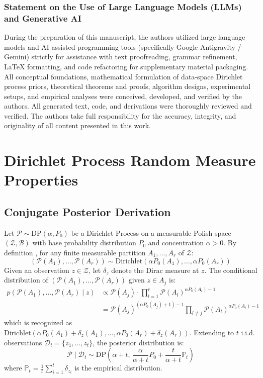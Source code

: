 \documentclass{article}
\begin{document}
\subsubsection*{Statement on the Use of Large Language Models (LLMs) and Generative AI}
During the preparation of this manuscript, the authors utilized large language models and AI-assisted programming tools (specifically Google Antigravity / Gemini) strictly for assistance with text proofreading, grammar refinement, LaTeX formatting, and code refactoring for supplementary material packaging. All conceptual foundations, mathematical formulation of data-space Dirichlet process priors, theoretical theorems and proofs, algorithm designs, experimental setups, and empirical analyses were conceived, developed, and verified by the authors. All generated text, code, and derivations were thoroughly reviewed and verified. The authors take full responsibility for the accuracy, integrity, and originality of all content presented in this work.




\newpage
\appendix
\section{Dirichlet Process Random Measure Properties}
\label{app:dp_properties}

\subsection{Conjugate Posterior Derivation}
Let $\mathcal{P} \sim \mathrm{DP}(\alpha, P_0)$ be a Dirichlet Process on a measurable Polish space $(\mathcal{Z}, \mathcal{B})$ with base probability distribution $P_0$ and concentration $\alpha > 0$. By definition \citep{ferguson1973bayesian}, for any finite measurable partition $A_1, \dots, A_r$ of $\mathcal{Z}$:
\begin{equation}
(\mathcal{P}(A_1), \dots, \mathcal{P}(A_r)) \sim \mathrm{Dirichlet}(\alpha P_0(A_1), \dots, \alpha P_0(A_r))
\end{equation}
Given an observation $z \in \mathcal{Z}$, let $\delta_z$ denote the Dirac measure at $z$. The conditional distribution of $(\mathcal{P}(A_1), \dots, \mathcal{P}(A_r))$ given $z \in A_j$ is:
\begin{align}
p(\mathcal{P}(A_1), \dots, \mathcal{P}(A_r) \mid z) &\propto \mathcal{P}(A_j) \cdot \prod_{l=1}^r \mathcal{P}(A_l)^{\alpha P_0(A_l) - 1} \\
&= \mathcal{P}(A_j)^{(\alpha P_0(A_j) + 1) - 1} \prod_{l \neq j} \mathcal{P}(A_l)^{\alpha P_0(A_l) - 1}
\end{align}
which is recognized as $\mathrm{Dirichlet}(\alpha P_0(A_1) + \delta_z(A_1), \dots, \alpha P_0(A_r) + \delta_z(A_r))$. Extending to $t$ i.i.d. observations $\mathcal{D}_t = \{z_1, \dots, z_t\}$, the posterior distribution is:
\begin{equation}
\mathcal{P} \mid \mathcal{D}_t \sim \mathrm{DP}\left(\alpha + t, \, \frac{\alpha}{\alpha + t} P_0 + \frac{t}{\alpha + t} \mathbb{P}_t\right)
\end{equation}
where $\mathbb{P}_t = \frac{1}{t}\sum_{i=1}^t \delta_{z_i}$ is the empirical distribution.
\end{document}
